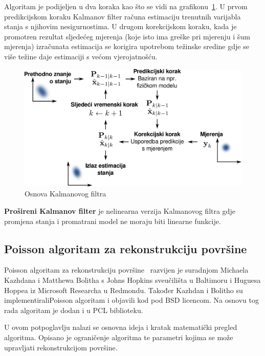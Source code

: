 Algoritam je podijeljen u dva koraka kao što se vidi na
grafikonu~\ref{fig:basic-kalman}. U prvom predikcijskom koraku Kalmanov
filter računa estimaciju trenutnih varijabla stanja s njihovim
nesigurnostima. U drugom korekcijskom koraku, kada je promotren rezultat
sljedećeg mjerenja (koje isto ima greške pri mjerenju i šum mjerenja)
izračunata estimacija se korigira upotrebom težinske sredine gdje se
više težine daje estimaciji s većom vjerojatnošću.

\begin{figure}[h]
\centering
\renewcommand{\figurename}{Grafikon}
\includegraphics[scale=0.35]{figures/basic-kalman.pdf}
\caption{Osnova Kalmanovog filtra}
\label{fig:basic-kalman}
\end{figure}

\textbf{Prošireni Kalmanov filter} je nelinearna verzija Kalmanovog
filtra gdje promjena stanja i promatrani model ne moraju biti linearne
funkcije.



\newpage
\subsection{Poisson algoritam za rekonstrukciju površine} %
\label{sub:Poisson}
Poisson algoritam za rekonstrukciju površine~\cite{Kazhdan:2006}
razvijen je suradnjom Michaela Kazhdana i Matthewa Bolitha s Johns
Hopkins sveučilišta u Baltimoru i Huguesa Hoppea iz Microsoft Researcha
u Redmondu. Također Kazhdan i Bolitho su implementirali\footnotemark[1]
Poisson algoritam i objavili kod pod BSD licencom. Na osnovu tog rada
algoritam je dodan i u PCL biblioteku.

U ovom potpoglavlju nalazi se osnovna ideja i kratak matematički pregled
algoritma. Opisano je ograničenje algoritma te parametri kojima se može
upravljati rekonstrukcijom površine.


